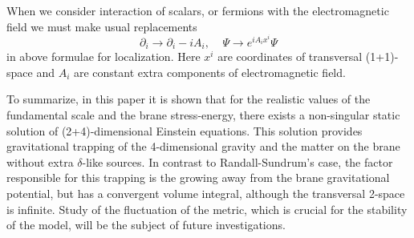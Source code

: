 \documentclass[a4paper,a4paper]{article}
\begin{document}
When we consider interaction of scalars, or fermions with the
electromagnetic field we must make usual replacements
\begin{equation} \label{interaction}
\partial_i \rightarrow \partial_i - iA_i , ~~~~~\Psi \rightarrow
e^{iA_i x^i} \Psi
\end{equation}
in above formulae for localization. Here $x^i$ are coordinates of
transversal (1+1)-space and $A_i$ are constant extra components of
electromagnetic field. 

To summarize, in this paper it is shown that for the realistic
values of the fundamental scale and the brane stress-energy, there
exists a non-singular static solution of (2+4)-dimensional
Einstein equations. This solution provides gravitational trapping
of the 4-dimensional gravity and the matter on the brane without
extra $\delta$-like sources. In contrast to Randall-Sundrum's
case, the factor responsible for this trapping is the growing
away from the brane gravitational potential, but has a convergent
volume integral, although the transversal 2-space is infinite.
Study of the fluctuation of the metric, which is crucial for the
stability of the model, will be the subject of future
investigations.
\end{document}
